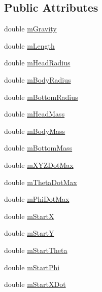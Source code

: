 \subsection*{Public Attributes}
\begin{DoxyCompactItemize}
\item 
double \hyperlink{class_lagrangian_racer_data_a2c340e07fe3519f15e872a228f96bf24}{m\-Gravity}
\item 
double \hyperlink{class_lagrangian_racer_data_a2b78bd4a43be558d55b3415d4c10a32c}{m\-Length}
\item 
double \hyperlink{class_lagrangian_racer_data_a1ceba8b9818f1e838029136579a2ae0b}{m\-Head\-Radius}
\item 
double \hyperlink{class_lagrangian_racer_data_ad374a97e1a9c895af9a03e5149085fff}{m\-Body\-Radius}
\item 
double \hyperlink{class_lagrangian_racer_data_a41117d72e1cec8183499670f106df028}{m\-Bottom\-Radius}
\item 
double \hyperlink{class_lagrangian_racer_data_afd955e790601a655e78bca4427214e4d}{m\-Head\-Mass}
\item 
double \hyperlink{class_lagrangian_racer_data_a5c5db20c2be3befd438610dd3e2e0cab}{m\-Body\-Mass}
\item 
double \hyperlink{class_lagrangian_racer_data_a4753daf5933b5682f24238a4ce8ff826}{m\-Bottom\-Mass}
\item 
double \hyperlink{class_lagrangian_racer_data_a1ae8b9a4774c97eada607bea3588e12c}{m\-X\-Y\-Z\-Dot\-Max}
\item 
double \hyperlink{class_lagrangian_racer_data_a675af79a245f4b87be42c231fc2a0cb4}{m\-Theta\-Dot\-Max}
\item 
double \hyperlink{class_lagrangian_racer_data_ae29fef4cc2252ff093469d86344fd500}{m\-Phi\-Dot\-Max}
\item 
double \hyperlink{class_lagrangian_racer_data_a41ce1797ecc7d474dfa1facf87215c68}{m\-Start\-X}
\item 
double \hyperlink{class_lagrangian_racer_data_a54d64aa25b1892898ade2ba0db033289}{m\-Start\-Y}
\item 
double \hyperlink{class_lagrangian_racer_data_a7c08ebeb85dd7ba4860a843d9423217d}{m\-Start\-Theta}
\item 
double \hyperlink{class_lagrangian_racer_data_a8bebb8cb938477d7daeefe3c3c09d333}{m\-Start\-Phi}
\item 
double \hyperlink{class_lagrangian_racer_data_acb10387e8f9696008a48c9d3d917ffd3}{m\-Start\-X\-Dot}
\item 

\end{DoxyCompactItemize}
